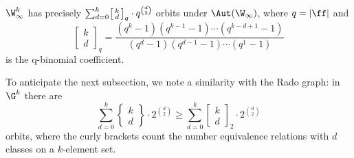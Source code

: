 \begin{proposition}\label{prop:symplectic-oligomorphic}
    $\W_\infty^k$ has precisely \(
        \sum_{d = 0}^k \begin{bsmallmatrix}k \\ d \end{bsmallmatrix}_q \cdot q^{\binom{d}{2}}
    \) orbits under $\Aut(\W_\infty)$,
    where $q = \vert \ff \vert$ and \[
        \begin{bmatrix}k \\ d \end{bmatrix}_q 
        = \frac{
            (q^k - 1)(q^{k-1} - 1) \cdots (q^{k-d+1} - 1)
        }{
            (q^d - 1) (q^{d-1} - 1) \cdots (q^1 - 1)
        }
    \] is the q-binomial coefficient. 
\end{proposition}
\begin{remark}
    To anticipate the next subsection, we note a similarity with the Rado graph: 
    in $\G^k$ there are \[
        \sum_{d=0}^k \left\{\begin{matrix}k \\ d \end{matrix}\right\} \cdot 2^{\binom{d}{2}}
        \geq 
        \sum_{d = 0}^k \begin{bmatrix}k \\ d \end{bmatrix}_2 \cdot 2^{\binom{d}{2}}
    \] orbits,
    where the curly brackets count the number equivalence relations with $d$ classes on a $k$-element set.
\end{remark}

